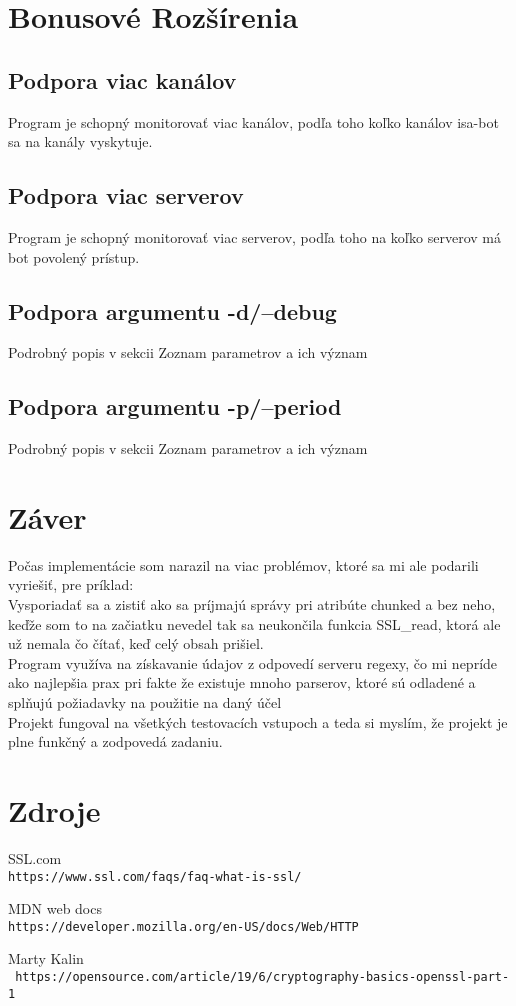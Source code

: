 \documentclass[11pt,a4paper]{article}
\begin{document}
	
\section{Bonusové Rozšírenia}

	\subsection{Podpora viac kanálov}
    Program je schopný monitorovať viac kanálov, podľa toho koľko kanálov isa-bot sa na kanály vyskytuje.
    \subsection{Podpora viac serverov}
    Program je schopný monitorovať viac serverov, podľa toho na koľko serverov má bot povolený prístup.
    \subsection{Podpora argumentu -d/--debug}
        Podrobný popis v sekcii Zoznam parametrov a ich význam
    \subsection{Podpora argumentu -p/--period}
        Podrobný popis v sekcii Zoznam parametrov a ich význam
\section{Záver}
    \indent Počas implementácie som narazil na viac problémov, ktoré sa mi ale podarili vyriešiť, pre príklad:
    \\ Vysporiadať sa a zistiť ako sa príjmajú správy pri atribúte chunked a bez neho, keďže som to na začiatku nevedel tak sa neukončila funkcia SSL\_read, ktorá ale už nemala čo čítať, keď celý obsah prišiel.
    \\ Program využíva na získavanie údajov z odpovedí serveru regexy, čo mi nepríde ako najlepšia prax pri fakte že existuje mnoho parserov, ktoré sú odladené a splňujú požiadavky na použitie na daný účel
    \\ \indent Projekt fungoval na všetkých testovacích vstupoch a teda si myslím, že projekt je plne funkčný a zodpovedá zadaniu.



\section{Zdroje}
\begin{thebibliography}{9}
    SSL.com
    \\\texttt{https://www.ssl.com/faqs/faq-what-is-ssl/}
    
    MDN web docs
    \\\texttt{https://developer.mozilla.org/en-US/docs/Web/HTTP}
    
    Marty Kalin
    \\\texttt{
    https://opensource.com/article/19/6/cryptography-basics-openssl-part-1
    }
\end{thebibliography}
\end{document}
